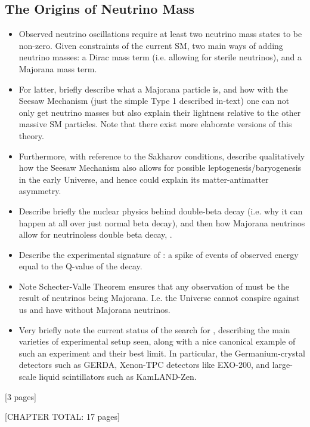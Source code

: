 {\subsection{The Origins of Neutrino Mass}
\begin{itemize}
    \item Observed neutrino oscillations require at least two neutrino mass states to be non-zero. Given constraints of the current SM, two main ways of adding neutrino masses: a Dirac mass term (i.e. allowing for sterile neutrinos), and a Majorana mass term.
    \item For latter, briefly describe what a Majorana particle is, and how with the Seesaw Mechanism (just the simple Type 1 described in-text) one can not only get neutrino masses but also explain their lightness relative to the other massive SM particles. Note that there exist more elaborate versions of this theory.
    \item Furthermore, with reference to the Sakharov conditions, describe qualitatively how the Seesaw Mechanism also allows for possible leptogenesis/baryogenesis in the early Universe, and hence could explain its matter-antimatter asymmetry.
    \item Describe briefly the nuclear physics behind double-beta decay (i.e. why it can happen at all over just normal beta decay), and then how Majorana neutrinos allow for neutrinoless double beta decay, \onbb{}.
    \item Describe the experimental signature of \onbb{}: a spike of events of observed energy equal to the Q-value of the decay.
    \item Note Schecter-Valle Theorem ensures that any observation of \onbb{} must be the result of neutrinos being Majorana. I.e. the Universe cannot conspire against us and have \onbb{} without Majorana neutrinos.
    \item Very briefly note the current status of the search for \onbb{}, describing the main varieties of experimental setup seen, along with a nice canonical example of such an experiment and their best limit. In particular, the Germanium-crystal detectors such as GERDA, Xenon-TPC detectors like EXO-200, and large-scale liquid scintillators such as KamLAND-Zen.
\end{itemize}
[3 pages]

[CHAPTER TOTAL: 17 pages]
}